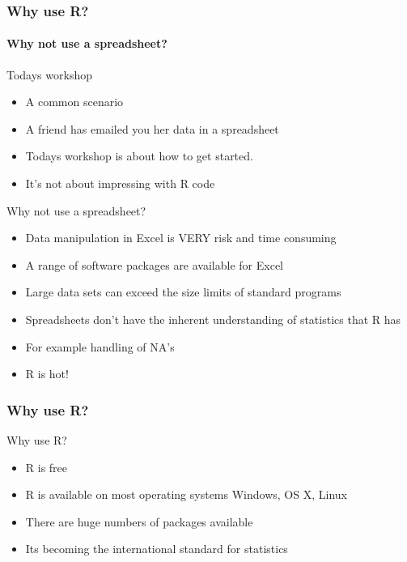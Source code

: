\documentclass[12pt]{beamer}\usepackage[]{graphicx}\usepackage[]{color}
\begin{document}
\begin{frame}
  \frametitle{Why use R?}
  \framesubtitle{Why not use a spreadsheet?}

\begin{block}{Todays workshop}
\begin{itemize}
\item A common scenario
\item A friend has emailed you her data in a spreadsheet
\item Todays workshop is about how to get started.
\item It's not about impressing with R code
\end{itemize}

\end{block}
  \begin{block}{Why not use a spreadsheet?}
  \begin{itemize}
    \item Data manipulation in Excel is VERY risk and time consuming
    \item A range of software packages are available for Excel
    \item Large data sets can exceed the size limits of standard programs
    \item Spreadsheets don't have the inherent understanding of statistics that R has
    \item For example handling of N\/A's
    \item R is hot!
  \end{itemize}
  \end{block}
\end{frame}

\begin{frame}
  \frametitle{Why use R?}
  \begin{block}{Why use R?}
  \begin{itemize}
    \item R is free
    \item R is available on most operating systems Windows, OS X, Linux
    \item There are huge numbers of packages available
    \item Its becoming the international standard for statistics
  \end{itemize}
  \end{block}
\end{frame}

\end{document}
